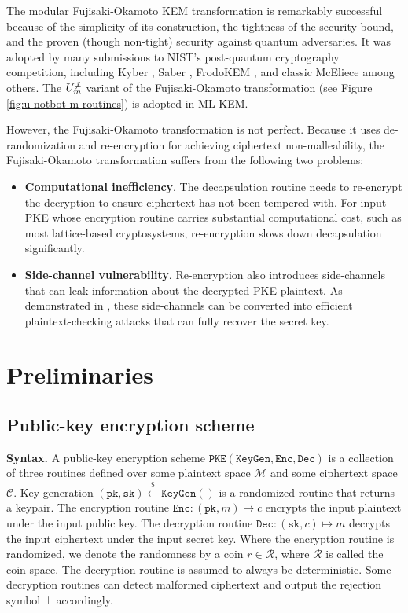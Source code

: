 \documentclass[journal=tches,submission]{iacrtrans}
\newcommand{\pke}{\texttt{PKE}}
\newcommand{\keygen}{\texttt{KeyGen}}
\newcommand{\encrypt}{\texttt{Enc}}
\newcommand{\decrypt}{\texttt{Dec}}
\newcommand{\pk}{\texttt{pk}}
\newcommand{\sk}{\texttt{sk}}
\newcommand{\leftsample}{\stackrel{\$}{\leftarrow}}
\begin{document}
The modular Fujisaki-Okamoto KEM transformation is remarkably successful because of the simplicity of its construction, the tightness of the security bound, and the proven (though non-tight) security against quantum adversaries. It was adopted by many submissions to NIST's post-quantum cryptography competition, including Kyber \cite{DBLP:conf/eurosp/BosDKLLSSSS18}, Saber \cite{DBLP:conf/africacrypt/DAnversKRV18}, FrodoKEM \cite{DBLP:conf/ccs/BosCDMNNRS16}, and classic McEliece \cite{classicmceliecespec} among others. The $U^{\not\bot}_m$ variant of the Fujisaki-Okamoto transformation (see Figure \ref{fig:u-notbot-m-routines}) is adopted in ML-KEM.

However, the Fujisaki-Okamoto transformation is not perfect. Because it uses de-randomization and re-encryption for achieving ciphertext non-malleability, the Fujisaki-Okamoto transformation suffers from the following two problems: \begin{itemize}
    \item \textbf{Computational inefficiency}. The decapsulation routine needs to re-encrypt the decryption to ensure ciphertext has not been tempered with. For input PKE whose encryption routine carries substantial computational cost, such as most lattice-based cryptosystems, re-encryption slows down decapsulation significantly.
    \item \textbf{Side-channel vulnerability}. Re-encryption also introduces side-channels that can leak information about the decrypted PKE plaintext. As demonstrated in \cite{ueno2022curse}\cite{ravi2019generic}\cite{DBLP:journals/tches/TanakaUXITH23}, these side-channels can be converted into efficient plaintext-checking attacks that can fully recover the secret key.
\end{itemize}

\section{Preliminaries}

\subsection{Public-key encryption scheme}
\textbf{Syntax.} A public-key encryption scheme $\pke(\keygen, \encrypt, \decrypt)$ is a collection of three routines defined over some plaintext space $\mathcal{M}$ and some ciphertext space $\mathcal{C}$. Key generation $(\pk, \sk) \leftsample \keygen()$ is a randomized routine that returns a keypair. The encryption routine $\encrypt: (\pk, m) \mapsto c$ encrypts the input plaintext under the input public key. The decryption routine $\decrypt: (\sk, c) \mapsto m$ decrypts the input ciphertext under the input secret key. Where the encryption routine is randomized, we denote the randomness by a coin $r \in \mathcal{R}$, where $\mathcal{R}$ is called the coin space. The decryption routine is assumed to always be deterministic. Some decryption routines can detect malformed ciphertext and output the rejection symbol $\bot$ accordingly.
\end{document}

